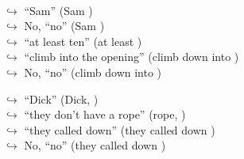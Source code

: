 \documentclass[11pt,a4paper, onecolumn]{article}
\begin{document}
\begin{figure}[t]
\begin{tcolorbox}[boxsep=0pt,left=5pt,right=0pt,top=2pt,colback = yellow!5]
\begin{dialogue}
\\
\colorbox{pink!25}{$\hookrightarrow$}
{ ``Sam'' (Sam ) }
\\
\colorbox{pink!25}{$\hookrightarrow$}
\colorbox{red!25}{No,}
{ ``no'' (Sam ) }
\\
\colorbox{pink!25}{$\hookrightarrow$}
{ ``at least ten'' (at least ) }
\\
\colorbox{pink!25}{$\hookrightarrow$}
{ ``climb into the opening'' (climb down into ) }
\\
\colorbox{pink!25}{$\hookrightarrow$}
\colorbox{red!25}{No,}
{ ``no'' (climb down into ) }
 \end{dialogue}\end{tcolorbox}\end{figure}\begin{figure}[t] \small \begin{tcolorbox}[boxsep=0pt,left=5pt,right=0pt,top=2pt,colback = yellow!5] \begin{dialogue}
 \small 
\colorbox{pink!25}{$\hookrightarrow$}
{ ``Dick'' (Dick, ) }
\\
\colorbox{pink!25}{$\hookrightarrow$}
{ ``they don't have a rope'' (rope, ) }
\\
\colorbox{pink!25}{$\hookrightarrow$}
{ ``they called down'' (they called down ) }
\\
\colorbox{pink!25}{$\hookrightarrow$}
\colorbox{red!25}{No,}
{ ``no'' (they called down ) }
\\
 \end{dialogue}\end{tcolorbox}\end{figure}
\end{document}
